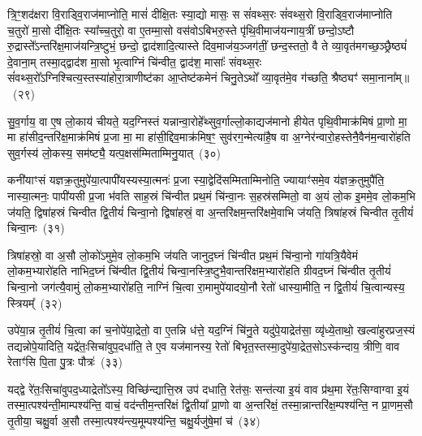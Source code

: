 त्रि॒ꣳ॒शद॑क्षरा वि॒राड्वि॒राज॑माप्नोति॒ मासं॑ दीक्षि॒तः स्या॒द्यो मासः॒ स सं॑वथ्स॒रः सं॑वथ्स॒रो वि॒राड्वि॒राज॑माप्नोति च॒तुरो॑ मा॒सो दी᳚क्षि॒तः स्या᳚च्च॒तुरो॒ वा ए॒तम्मा॒सो वस॑वो\-ऽबिभरु॒स्ते पृ॑थि॒वीमाज॑यन्गाय॒त्रीं छन्दो॒\-ऽष्टौ रु॒द्रास्ते᳚\-ऽन्तरि॑क्ष॒माज॑यन्त्रि॒ष्टुभं॒ छन्दो॒ द्वाद॑शादि॒त्यास्ते दिव॒माज॑य॒ञ्जग॑तीं॒ छन्द॒स्ततो॒ वै ते व्या॒वृत॑मगच्छ॒ञ्छ्रैष्ठ्यं॑ दे॒वाना॒म् तस्मा॒द्द्वाद॑श मा॒सो भृ॒त्वाग्निं चि॑न्वीत॒ द्वाद॑श॒ मासाः᳚ संवथ्स॒रः सं॑वथ्स॒रो᳚\-ऽग्निश्चित्य॒स्तस्या॑होरा॒त्राणीष्ट॑का आ॒प्तेष्ट॑कमेनं चिनु॒ते\-ऽथो᳚ व्या॒वृत॑मे॒व ग॑च्छति॒ श्रैष्ठ्यꣳ॑ समा॒नाना᳚म्॥~(२९)

{\anuvakamend[{स्या॒त्त्रयो॑दश त्रि॒ꣳ॒शत॒ꣳ॒ रात्री᳚र्दीक्षि॒तः स्या॒द्वै ते᳚\-ऽष्टाविꣳ॑शतिश्च}]}%

सु॒व॒र्गाय॒ वा ए॒ष लो॒काय॑ चीयते॒ यद॒ग्निस्तं यन्नान्वा॒रोहे᳚थ्सुव॒र्गाल्लो॒काद्यज॑मानो हीयेत पृथि॒वीमाक्र॑मिषं प्रा॒णो मा॒ मा हा॑सीद॒न्तरि॑क्ष॒माक्र॑मिषं प्र॒जा मा॒ मा हा॑सी॒द्दिव॒माक्र॑मिष॒ꣳ॒ सुव॑रग॒न्मेत्या॑है॒ष वा अ॒ग्नेर॑न्वारो॒हस्तेनै॒वैन॑\-म॒न्वारो॑हति सुव॒र्गस्य॑ लो॒कस्य॒ सम॑ष्ट्यै॒ यत्प॒क्षस॑म्मिताम्मिनु॒यात्~(३०)

कनी॑याꣳसं यज्ञक्र॒तुमुपे॑या॒त्पापी॑यस्यस्या॒त्मनः॑ प्र॒जा स्या॒द्वेदि॑सम्मिताम्मिनोति॒ ज्यायाꣳ॑समे॒व य॑ज्ञक्र॒तुमुपै॑ति॒ नास्या॒त्मनः॒ पापी॑यसी प्र॒जा भ॑वति साह॒स्रं चि॑न्वीत प्रथ॒मं चि॑न्वा॒नः स॒हस्र॑सम्मितो॒ वा अ॒यं लो॒क इ॒ममे॒व लो॒कम॒भि ज॑यति॒ द्विषा॑हस्रं चिन्वीत द्वि॒तीयं॑ चिन्वा॒नो द्विषा॑हस्रं॒ वा अ॒न्तरि॑क्षम॒न्तरि॑क्षमे॒वाभि ज॑यति॒ त्रिषा॑हस्रं चिन्वीत तृ॒तीयं॑ चिन्वा॒नः~(३१)

त्रिषा॑हस्रो॒ वा अ॒सौ लो॒को॑\-ऽमुमे॒व लो॒कम॒भि ज॑यति जानुद॒घ्नं चि॑न्वीत प्रथ॒मं चि॑न्वा॒नो गा॑यत्रि॒यैवेमं लो॒कम॒भ्यारो॑हति नाभिद॒घ्नं चि॑न्वीत द्वि॒तीयं॑ चिन्वा॒नस्त्रि॒ष्टुभै॒वान्तरि॑क्षम॒भ्यारो॑हति ग्रीवद॒घ्नं चि॑न्वीत तृ॒तीयं॑ चिन्वा॒नो जग॑त्यै॒वामुं लो॒कम॒भ्यारो॑हति॒ नाग्निं चि॒त्वा रा॒मामुपे॑यादयो॒नौ रेतो॑ धास्या॒मीति॒ न द्वि॒तीयं॑ चि॒त्वान्यस्य॒ स्त्रियम्᳚~(३२)

उपे॑या॒न्न तृ॒तीयं॑ चि॒त्वा कां च॒नोपे॑या॒द्रेतो॒ वा ए॒तन्नि ध॑त्ते॒ यद॒ग्निं चि॑नु॒ते यदु॑पे॒याद्रेत॑सा॒ व्यृ॑ध्ये॒ताथो॒ खल्वा॑हुरप्रज॒स्यं तद्यन्नोपे॒यादिति॒ यद्रे॑तः॒सिचा॑वुप॒दधा॑ति॒ ते ए॒व यज॑मानस्य॒ रेतो॑ बिभृत॒स्तस्मा॒दुपे॑या॒द्रेत॒सो\-ऽस्क॑न्दाय॒ त्रीणि॒ वाव रेताꣳ॑सि पि॒ता पु॒त्रः पौत्रः॑~(३३)

यद्द्वे रे॑तः॒सिचा॑वुपद॒ध्याद्रेतो᳚\-ऽस्य॒ विच्छि॑न्द्यात्ति॒स्र उप॑ दधाति॒ रेत॑सः॒ सन्त॑त्या इ॒यं वाव प्र॑थ॒मा रे॑तः॒सिग्वाग्वा इ॒यं तस्मा॒त्पश्य॑न्ती॒माम्पश्य॑न्ति॒ वाचं॒ वद॑न्तीम॒न्तरि॑क्षं द्वि॒तीया᳚ प्रा॒णो वा अ॒न्तरि॑क्षं॒ तस्मा॒न्नान्तरि॑क्ष॒म्पश्य॑न्ति॒ न प्रा॒णम॒सौ तृ॒तीया॒ चक्षु॒र्वा अ॒सौ तस्मा॒त्पश्य॑न्त्य॒मूम्पश्य॑न्ति॒ चक्षु॒र्यजु॑षे॒मां च॑~(३४)

